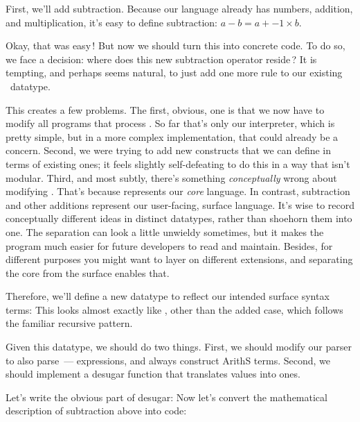 
First, we’ll add subtraction. Because our language already has numbers,
addition, and multiplication, it’s easy to define subtraction: $a-b=a+-1\times
b$.

Okay, that was easy\,! But now we should turn this into concrete code. To do so,
we face a decision: where does this new subtraction operator reside\,? It is
tempting, and perhaps seems natural, to just add one more rule to our existing
\ datatype.


This creates a few problems. The first, obvious, one is that we now have to
modify all programs that process . So far that’s only our
interpreter, which is pretty simple, but in a more complex implementation, that
could already be a concern. Second, we were trying to add new constructs that we
can define in terms of existing ones; it feels slightly self-defeating to do
this in a way that isn’t modular. Third, and most subtly, there’s something
\emph{conceptually} wrong about modifying . That’s because
 represents our \emph{core} language. In contrast, subtraction and
other additions represent our user-facing, surface language. It’s wise to record conceptually different ideas
in distinct datatypes, rather than shoehorn them into one. The separation can
look a little unwieldy sometimes, but it makes the program much easier for
future developers to read and maintain. Besides, for different purposes you
might want to layer on different extensions, and separating the core from the
surface enables that.

Therefore, we’ll define a new datatype to reflect our intended surface syntax
terms:
This looks almost exactly like , other than the added case, which
follows the familiar recursive pattern.

Given this datatype, we should do two things. First, we should modify our parser
to also parse\ --- expressions, and always construct ArithS terms. Second, we should implement a desugar function
that translates  values into  ones.

Let’s write the obvious part of desugar:
Now let’s convert the mathematical description of subtraction above into code:


